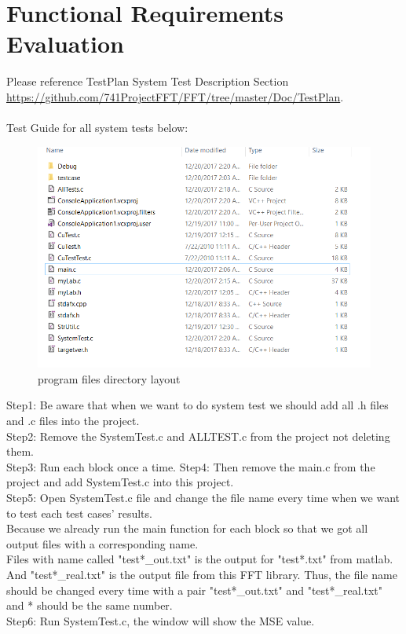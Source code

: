 \documentclass[12pt, titlepage]{article}
\begin{document}
\section{Functional Requirements Evaluation}
Please reference TestPlan System Test Description Section \url{https://github.com/741ProjectFFT/FFT/tree/master/Doc/TestPlan}.\\\\
Test Guide for all system tests below:\\
\begin{figure}[H]
 \includegraphics[width=\linewidth]{directory.PNG}
  \caption{program files directory layout}
  \label{fig:Direc}
\end{figure}
Step1: Be aware that when we want to do system test we should add all .h files and .c files into the project.\\
Step2: Remove the SystemTest.c and ALLTEST.c from the project not deleting them.\\
Step3: Run each block once a time.
Step4: Then remove the main.c from the project and add SystemTest.c into this project.\\
Step5: Open SystemTest.c file and change the file name every time when we want to test each test cases' results.\\
Because we already run the main function for each block so that we got all output files with a corresponding name.\\
Files with name called "test*\_out.txt" is the output for "test*.txt" from matlab. And "test*\_real.txt" is the output file from this 
FFT library. Thus, the file name should be changed every time with a pair  "test*\_out.txt" and "test*\_real.txt" and * should be the same number.\\
Step6: Run SystemTest.c, the window will show the MSE value.
\end{document}
